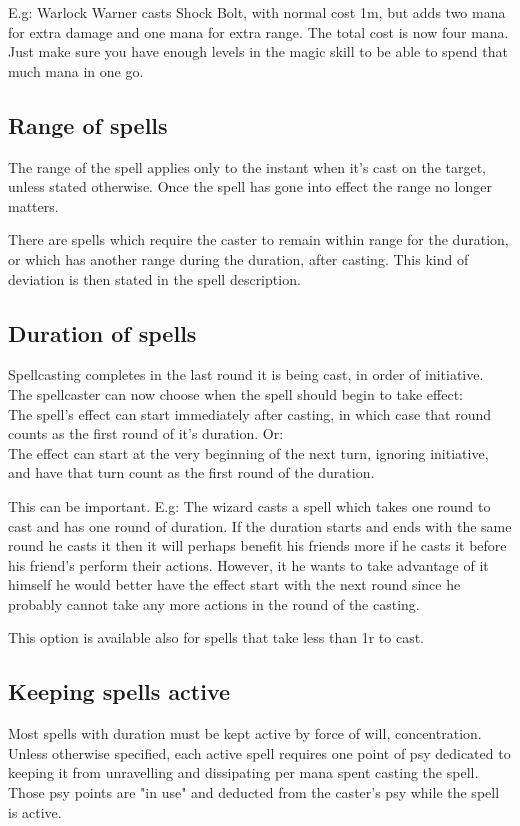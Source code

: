E.g: Warlock Warner casts Shock Bolt, with normal cost 1m, but adds two mana for extra damage and one mana for extra range. The total cost is now four mana.
Just make sure you have enough levels in the magic skill to be able to spend that much mana in one go.


\subsection*{Range of spells}
The range of the spell applies only to the instant when it's cast on the target, unless stated otherwise. Once the spell has gone into effect the range no longer matters.

There are spells which require the caster to remain within range for the duration, or which has another range during the duration, after casting. This kind of deviation is then stated in the spell description.


\subsection*{Duration of spells}
Spellcasting completes in the last round it is being cast, in order of initiative. The spellcaster can now choose when the spell should begin to take effect: \\
The spell's effect can start immediately after casting, in which case that round counts as the first round of it's duration. Or: \\
The effect can start at the very beginning of the next turn, ignoring initiative, and have that turn count as the first round of the duration.

This can be important. E.g: The wizard casts a spell which takes one round to cast and has one round of duration. If the duration starts and ends with the same round he casts it then it will perhaps benefit his friends more if he casts it before his friend's perform their actions. However, it he wants to take advantage of it himself he would better have the effect start with the next round since he probably cannot take any more actions in the round of the casting.

This option is available also for spells that take less than 1r to cast.


\subsection*{Keeping spells active}
Most spells with duration must be kept active by force of will, concentration. Unless otherwise specified, each active spell requires one point of psy dedicated to keeping it from unravelling and dissipating per mana spent casting the spell. Those psy points are "in use" and deducted from the caster's psy while the spell is active.

